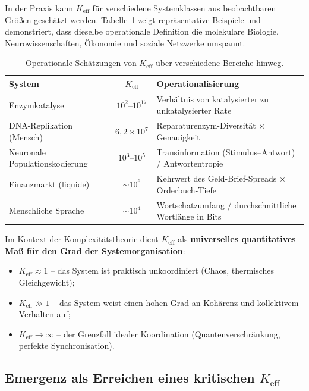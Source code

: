 \documentclass[11pt]{article}
\theoremstyle{remark}
\newcommand{\Keff}{K_{\mathrm{eff}}}
\begin{document}
	In der Praxis kann \(\Keff\) für verschiedene Systemklassen aus beobachtbaren Größen geschätzt werden. Tabelle~\ref{tab:keff_examples} zeigt repräsentative Beispiele und demonstriert, dass dieselbe operationale Definition die molekulare Biologie, Neurowissenschaften, Ökonomie und soziale Netzwerke umspannt.
	
	\begin{table}[H]
		\centering
		\caption{Operationale Schätzungen von \(\Keff\) über verschiedene Bereiche hinweg.}
		\label{tab:keff_examples}
		\begin{tabular}{l c l}
			\toprule
			\textbf{System} & \(\Keff\) & \textbf{Operationalisierung} \\
			\midrule
			Enzymkatalyse & \(10^2\)–\(10^{17}\) & Verhältnis von katalysierter zu unkatalysierter Rate \\
			DNA-Replikation (Mensch) & \(6,2\times10^7\) & Reparaturenzym-Diversität \(\times\) Genauigkeit \\
			Neuronale Populationskodierung & \(10^3\)–\(10^5\) & Transinformation (Stimulus–Antwort) / Antwortentropie \\
			Finanzmarkt (liquide) & \(\sim 10^6\) & Kehrwert des Geld-Brief-Spreads \(\times\) Orderbuch-Tiefe \\
			Menschliche Sprache & \(\sim 10^4\) & Wortschatzumfang / durchschnittliche Wortlänge in Bits \\
			\bottomrule
		\end{tabular}
	\end{table}
	
	Im Kontext der Komplexitätstheorie dient \(\Keff\) als \textbf{universelles quantitatives Maß für den Grad der Systemorganisation}:
	\begin{itemize}
		\item \(\Keff \approx 1\) – das System ist praktisch unkoordiniert (Chaos, thermisches Gleichgewicht);
		\item \(\Keff \gg 1\) – das System weist einen hohen Grad an Kohärenz und kollektivem Verhalten auf;
		\item \(\Keff \to \infty\) – der Grenzfall idealer Koordination (Quantenverschränkung, perfekte Synchronisation).
	\end{itemize}
	
	\subsection{Emergenz als Erreichen eines kritischen \(\Keff\)}
	
\end{document}
